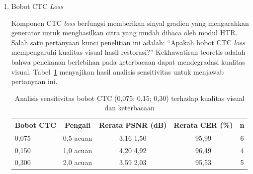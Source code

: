 \begin{enumerate}[leftmargin=1.5em, labelsep=0.5em, itemindent=0pt, label=\arabic*., topsep=0pt, partopsep=0pt]
\begin{enumerate}[leftmargin=1.5em, labelsep=0.5em, itemindent=0pt, topsep=0.5em, label=\alph*.]
        Hasil analisis menunjukkan bahwa peningkatan bobot dari 50 ke 100 (2\texttimes{} acuan) menghasilkan peningkatan PSNR sebesar 118\% (dari 2,40 dB ke 5,25 dB), dengan efek samping perbaikan CER (92,14\% berbanding 99,02\%). Bobot piksel 100 menempati 4 dari 5 posisi teratas pada \textit{grid search}, mengonfirmasi dominasinya dalam optimasi visual. Meskipun demikian, konfigurasi produksi menggunakan bobot 50 untuk menjaga keseimbangan dengan komponen lain dalam konvergensi jangka panjang. Pelatihan produksi dengan bobot piksel 50 mencapai PSNR 30,91 dB, menunjukkan bahwa bobot moderat memadai ketika dikombinasikan dengan \textit{curriculum learning}. Perlu diperhatikan bahwa bobot 100 berisiko mendominasi sinyal gradien sehingga dapat menghambat pembelajaran fitur semantik dari komponen CTC dan RecFeat.

        \item Bobot CTC \textit{Loss}
        
        Komponen CTC \textit{loss} berfungsi memberikan sinyal gradien yang mengarahkan generator untuk menghasilkan citra yang mudah dibaca oleh modul HTR. Salah satu pertanyaan kunci penelitian ini adalah: ``Apakah bobot CTC \textit{loss} mempengaruhi kualitas visual hasil restorasi?'' Kekhawatiran teoretis adalah bahwa penekanan berlebihan pada keterbacaan dapat mendegradasi kualitas visual. Tabel~\ref{tab:ctc-sensitivity} menyajikan hasil analisis sensitivitas untuk menjawab pertanyaan ini.

        \begin{table}[!htbp]
            \caption[Sensitivitas bobot CTC]{Analisis sensitivitas bobot CTC (0,075; 0,15; 0,30) terhadap kualitas visual dan keterbacaan}
            \label{tab:ctc-sensitivity}
            \normalsize
            \begin{tabular}{lcccc}
                \hline
                \textbf{Bobot CTC} & \textbf{Pengali}    & \textbf{Rerata PSNR (dB)} & \textbf{Rerata CER (\%)} & \textbf{n} \\
                \hline
                0,075      & 0,5\texttimes{} acuan & 3,16 \textpm{} 1,50   & 95,99        & 6 \\
                0,150      & 1,0\texttimes{} acuan & 4,20 \textpm{} 4,92   & 96,49        & 4 \\
                0,300      & 2,0\texttimes{} acuan & 3,59 \textpm{} 2,03   & 95,53        & 5 \\
                \hline
            \end{tabular}
        \end{table}


\end{enumerate}
\end{enumerate}
